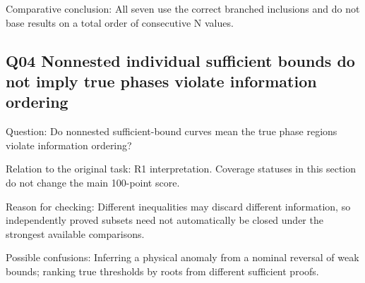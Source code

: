 \documentclass[11pt,a4paper]{article}
\begin{document}
Comparative conclusion: All seven use the correct branched inclusions and do not base results on a total order of consecutive N values.

\clearpage
\subsection{Q04 Nonnested individual sufficient bounds do not imply true phases violate information ordering}
\label{aspect:Q04}
Question: Do nonnested sufficient-bound curves mean the true phase regions violate information ordering?

Relation to the original task: R1 interpretation. Coverage statuses in this section do not change the main 100-point score.

Reason for checking: Different inequalities may discard different information,\allowbreak{} so independently proved subsets need not automatically be closed under the strongest available comparisons.

Possible confusions: Inferring a physical anomaly from a nominal reversal of weak bounds; ranking true thresholds by roots from different sufficient proofs.
\end{document}
